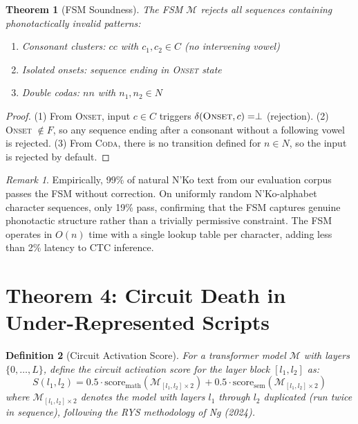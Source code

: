 \documentclass[11pt]{article}
\newtheorem{theorem}{Theorem}
\newtheorem{definition}[theorem]{Definition}
\theoremstyle{remark}
\newtheorem{remark}{Remark}
\begin{document}
\begin{theorem}[FSM Soundness]
The FSM $\mathcal{M}$ rejects all sequences containing phonotactically invalid patterns:
\begin{enumerate}
\item Consonant clusters: $cc$ with $c_1, c_2 \in C$ (no intervening vowel)
\item Isolated onsets: sequence ending in \textsc{Onset} state
\item Double codas: $nn$ with $n_1, n_2 \in N$
\end{enumerate}
\end{theorem}

\begin{proof}
(1) From \textsc{Onset}, input $c \in C$ triggers $\delta(\textsc{Onset}, c) = \perp$ (rejection). (2) \textsc{Onset} $\notin F$, so any sequence ending after a consonant without a following vowel is rejected. (3) From \textsc{Coda}, there is no transition defined for $n \in N$, so the input is rejected by default.
\end{proof}

\begin{remark}
Empirically, 99\% of natural N'Ko text from our evaluation corpus passes the FSM without correction. On uniformly random N'Ko-alphabet character sequences, only 19\% pass, confirming that the FSM captures genuine phonotactic structure rather than a trivially permissive constraint. The FSM operates in $O(n)$ time with a single lookup table per character, adding less than 2\% latency to CTC inference.
\end{remark}

\section{Theorem 4: Circuit Death in Under-Represented Scripts}

\begin{definition}[Circuit Activation Score]
For a transformer model $\mathcal{M}$ with layers $\{0, \ldots, L\}$, define the circuit activation score for the layer block $[l_1, l_2]$ as:
\begin{equation}
S(l_1, l_2) = 0.5 \cdot \text{score}_{\text{math}}(\mathcal{M}_{[l_1, l_2] \times 2}) + 0.5 \cdot \text{score}_{\text{sem}}(\mathcal{M}_{[l_1, l_2] \times 2})
\end{equation}
where $\mathcal{M}_{[l_1, l_2] \times 2}$ denotes the model with layers $l_1$ through $l_2$ duplicated (run twice in sequence), following the RYS methodology of Ng (2024).
\end{definition}
\end{document}
